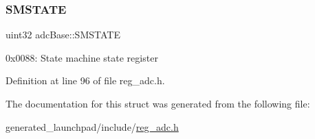 \subsubsection{\texorpdfstring{S\+M\+S\+T\+A\+TE}{SMSTATE}}
{\footnotesize\ttfamily uint32 adc\+Base\+::\+S\+M\+S\+T\+A\+TE}

0x0088\+: State machine state register 

Definition at line 96 of file reg\+\_\+adc.\+h.



The documentation for this struct was generated from the following file\+:\begin{DoxyCompactItemize}
\item 
generated\+\_\+launchpad/include/\mbox{\hyperlink{reg__adc_8h}{reg\+\_\+adc.\+h}}\end{DoxyCompactItemize}
